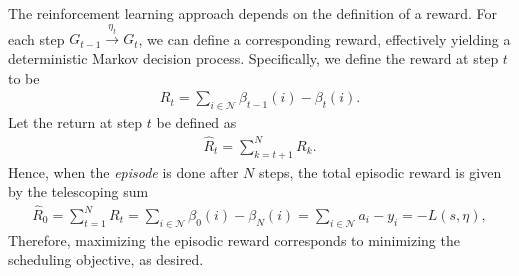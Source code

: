 \documentclass[a4paper]{report}
\theoremstyle{definition}
\theoremstyle{plain}
\begin{document}
The reinforcement learning approach depends on the definition of a reward. For
each step $G_{t-1} \xrightarrow{\eta_{t}} G_{t}$, we can define a corresponding
reward, effectively yielding a deterministic Markov decision process.
Specifically, we define the reward at step $t$ to be
\begin{align*}
  R_{t} = \sum_{i \in \mathcal{N}} \beta_{t-1}(i) - \beta_{t}(i) .
\end{align*}
Let the return at step $t$ be defined as
\begin{align*}
  \hat{R}_{t} = \sum_{k=t + 1}^{N} R_{k} .
\end{align*}
Hence, when the \textit{episode} is done after $N$ steps, the total episodic
reward is given by the telescoping sum
\begin{align*}
  \hat{R}_{0} = \sum_{t=1}^{N} R_{t} = \sum_{i \in \mathcal{N}} \beta_{0}(i) - \beta_{N}(i)  = \sum_{i \in \mathcal{N}} a_{i} - y_{i} = - L(s, \eta) ,
\end{align*}
Therefore, maximizing the episodic reward corresponds to minimizing the
scheduling objective, as desired.
%
\end{document}
